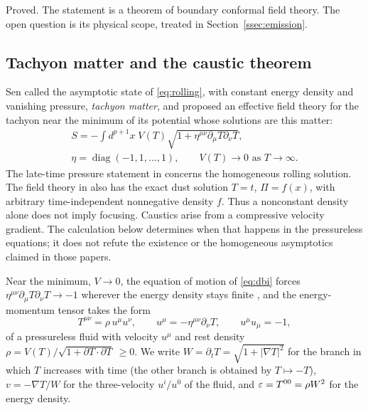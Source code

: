 \begin{verdict}[claim 16]
Proved. The statement is a theorem of boundary conformal field theory. The open question is its physical scope, treated in Section~\ref{ssec:emission}.
\end{verdict}

\subsection{Tachyon matter and the caustic theorem}\label{ssec:caustic}

Sen \cite{Sen02matter} called the asymptotic state of \eqref{eq:rolling}, with constant energy density and vanishing pressure, \emph{tachyon matter}, and \cite{Sen02field} proposed an effective field theory for the tachyon near the minimum of its potential whose solutions are this matter:
\begin{equation}\label{eq:dbi}
\begin{gathered}
S = -\int d^{p+1}x\; V(T)\sqrt{1+\eta^{\mu\nu}\partial_\mu T\partial_\nu T},\\
\eta = \operatorname{diag}(-1,1,\dots,1),\qquad V(T)\to 0 \text{ as } T\to\infty .
\end{gathered}
\end{equation}
The late-time pressure statement in \cite{Sen02matter} concerns the homogeneous rolling solution. The field theory in \cite{Sen02field} also has the exact dust solution $T=t$, $\Pi=f(x)$, with arbitrary time-independent nonnegative density $f$. Thus a nonconstant density alone does not imply focusing. Caustics arise from a compressive velocity gradient. The calculation below determines when that happens in the pressureless equations; it does not refute the existence or the homogeneous asymptotics claimed in those papers.

Near the minimum, $V\to0$, the equation of motion of \eqref{eq:dbi} forces $\eta^{\mu\nu}\partial_\mu T\partial_\nu T\to -1$ wherever the energy density stays finite \cite[Section~2]{Sen02field}, and the energy-momentum tensor takes the form
\begin{equation}\label{eq:dust}
T^{\mu\nu} = \rho\, u^\mu u^\nu,\qquad u^\mu = -\eta^{\mu\nu}\partial_\nu T,\qquad u^\mu u_\mu = -1,
\end{equation}
of a pressureless fluid with velocity $u^\mu$ and rest density $\rho = V(T)/\sqrt{1+\partial T\cdot\partial T}\ \ge 0$. We write $W = \partial_t T = \sqrt{1+|\nabla T|^2}$ for the branch in which $T$ increases with time (the other branch is obtained by $T\mapsto -T$), $v = -\nabla T/W$ for the three-velocity $u^i/u^0$ of the fluid, and $\varepsilon = T^{00} = \rho W^2$ for the energy density.

